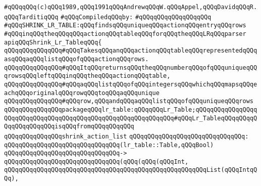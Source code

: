 \label{src/app/yacc/src/shrink-lr-table.api}
\verb|#qQQqqQQq(c)qQQq1989,qQQq1991qQQqAndrewqQQqW.qQQqAppel,qQQqDavidqQQqR.qQQqTarditiqQQq|\newline
\newline
\verb|#qQQqCompiledqQQqby:|\newline
\verb|#qQQqqQQqqQQqqQQqqQQq|\newline
\newline
\verb|#qQQqSHRINK_LR_TABLE:qQQqfindsqQQquniqueqQQqactionqQQqentryqQQqrows|\newline
\verb|#qQQqinqQQqtheqQQqqQQqactionqQQqtableqQQqforqQQqtheqQQqLRqQQqparser|\newline
\newline
\verb|apiqQQqShrink_Lr_TableqQQq{|\newline
\newline
\verb|qQQqqQQqqQQqqQQq#qQQqTakesqQQqanqQQqactionqQQqtableqQQqrepresentedqQQqasqQQqaqQQqlistqQQqofqQQqactionqQQqrows.|\newline
\verb|qQQqqQQqqQQqqQQq#qQQqItqQQqreturnsqQQqtheqQQqnumberqQQqofqQQquniqueqQQqrowsqQQqleftqQQqinqQQqtheqQQqactionqQQqtable,|\newline
\verb|qQQqqQQqqQQqqQQq#qQQqaqQQqlistqQQqofqQQqintegersqQQqwhichqQQqmapsqQQqeachqQQqoriginalqQQqrowqQQqtoqQQqaqQQqunique|\newline
\verb|qQQqqQQqqQQqqQQq#qQQqrow,qQQqandqQQqaqQQqlistqQQqofqQQquniqueqQQqrows|\newline
\newline
\verb|qQQqqQQqqQQqqQQqpackageqQQqlr_table:qQQqqQQqLr_Table;qQQqqQQqqQQqqQQqqQQqqQQqqQQqqQQqqQQqqQQqqQQqqQQqqQQqqQQqqQQqqQQq#qQQqLr_TableqQQqqQQqqQQqqQQqqQQqqQQqisqQQqfromqQQqqQQqqQQq|\newline
\newline
\verb|qQQqqQQqqQQqqQQqshrink_action_list|\newline
\verb|qQQqqQQqqQQqqQQqqQQqqQQqqQQqqQQq:|\newline
\verb|qQQqqQQqqQQqqQQqqQQqqQQqqQQqqQQq(lr_table::Table,qQQqBool)|\newline
\verb|qQQqqQQqqQQqqQQqqQQqqQQqqQQqqQQq->|\newline
\verb|qQQqqQQqqQQqqQQqqQQqqQQqqQQqqQQq(qQQq(qQQq(qQQqInt,|\newline
\verb|qQQqqQQqqQQqqQQqqQQqqQQqqQQqqQQqqQQqqQQqqQQqqQQqqQQqqQQqList(qQQqIntqQQq),|\newline
